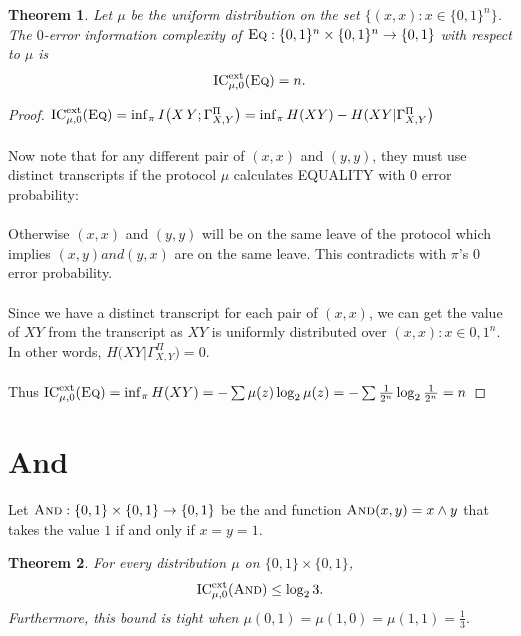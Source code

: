 \documentclass[11pt,oneside]{book}
\theoremstyle{plain}
\newtheorem{theorem}{Theorem}
\theoremstyle{definition}
\theoremstyle{plain}
\newcommand{\Eq}{\textsc{Eq}}
\newcommand{\ICext}{\mathrm{IC}^{\mathrm{ext}}}
\begin{document}
\begin{theorem}
	Let $\mu$ be the uniform distribution on the set $\{(x,x) : x \in \{0,1\}^n\}$. The $0$-error information complexity of $\Eq : \{0,1\}^n \times \{0,1\}^n \to \{0,1\}$ with respect to $\mu$ is
	\[
	\ICext_{\mu,0}(\Eq) = n.
	\]
\end{theorem}

\begin{proof}
	$\ICext_{\mu,0}(\Eq) = \inf_{\pi} I\big( X\,Y ; \Gamma_{X,Y}^\Pi \big) = \inf_{\pi} H(XY) - H(XY|\Gamma_{X,Y}^\Pi \big)$\\
	\\
	Now note that for any different pair of $(x,x)$ and $(y,y)$, they must use distinct transcripts if the protocol $\mu$ calculates EQUALITY with $0$ error probability: \\
	\\ 
	Otherwise $(x,x)$ and $(y,y)$ will be on the same leave of the protocol which implies $(x,y) and (y,x)$ are on the same leave. This contradicts with $\pi$'s $0$ error probability. \\
	\\
	Since we have a distinct transcript for each pair of $(x,x)$, we can get the value of $XY$ from the transcript as $XY$ is uniformly distributed over ${(x,x): x \in {0,1}^n}$. In other words, $H(XY|\Gamma_{X,Y}^\Pi \big) = 0$.\\
	\\
	Thus $\ICext_{\mu,0}(\Eq) = \inf_{\pi} H(XY) = - \sum \mu(z)\log_2\mu(z) = - \sum \frac1{2^n}\log_2\frac1{2^n} = n$
\end{proof}

 
\section{And}

Let $\textsc{And} : \{0,1\} \times \{0,1\} \to \{0,1\}$ be the and function $\textsc{And}(x,y) = x \wedge y$ that takes the value $1$ if and only if $x = y = 1$.

\begin{theorem}
	For every distribution $\mu$ on $\{0,1\} \times \{0,1\}$,
	\[
	\ICext_{\mu,0}(\textsc{And}) \le \log_2 3.
	\]
	Furthermore, this bound is tight when $\mu(0,1) = \mu(1,0) = \mu(1,1) = \frac13$.
\end{theorem}
\end{document}
